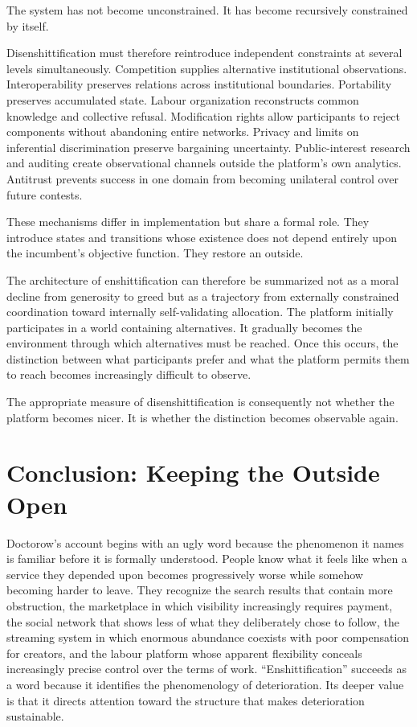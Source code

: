 \documentclass[11pt]{article}
\begin{document}
The system has not become unconstrained. It has become recursively constrained by itself.

Disenshittification must therefore reintroduce independent constraints at several levels simultaneously. Competition supplies alternative institutional observations. Interoperability preserves relations across institutional boundaries. Portability preserves accumulated state. Labour organization reconstructs common knowledge and collective refusal. Modification rights allow participants to reject components without abandoning entire networks. Privacy and limits on inferential discrimination preserve bargaining uncertainty. Public-interest research and auditing create observational channels outside the platform's own analytics. Antitrust prevents success in one domain from becoming unilateral control over future contests.

These mechanisms differ in implementation but share a formal role. They introduce states and transitions whose existence does not depend entirely upon the incumbent's objective function. They restore an outside.

The architecture of enshittification can therefore be summarized not as a moral decline from generosity to greed but as a trajectory from externally constrained coordination toward internally self-validating allocation. The platform initially participates in a world containing alternatives. It gradually becomes the environment through which alternatives must be reached. Once this occurs, the distinction between what participants prefer and what the platform permits them to reach becomes increasingly difficult to observe.

The appropriate measure of disenshittification is consequently not whether the platform becomes nicer. It is whether the distinction becomes observable again.

\section{Conclusion: Keeping the Outside Open}

Doctorow's account begins with an ugly word because the phenomenon it names is familiar before it is formally understood. People know what it feels like when a service they depended upon becomes progressively worse while somehow becoming harder to leave. They recognize the search results that contain more obstruction, the marketplace in which visibility increasingly requires payment, the social network that shows less of what they deliberately chose to follow, the streaming system in which enormous abundance coexists with poor compensation for creators, and the labour platform whose apparent flexibility conceals increasingly precise control over the terms of work. ``Enshittification'' succeeds as a word because it identifies the phenomenology of deterioration. Its deeper value is that it directs attention toward the structure that makes deterioration sustainable.
\end{document}
